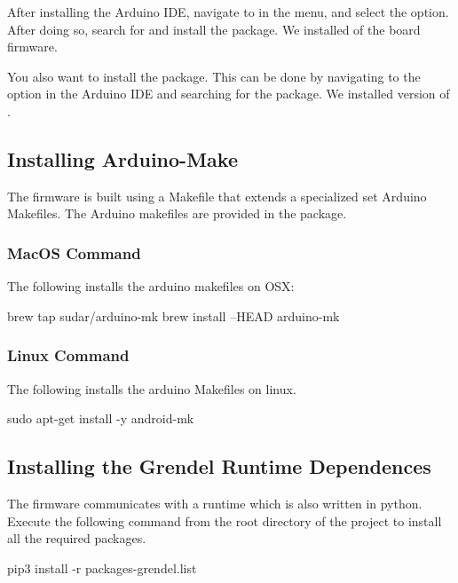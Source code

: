 After installing the Arduino IDE, navigate to  in the menu, and select the 
option. After doing so, search for  and install the  package. We installed  of the
   board firmware.

You also want to install the  package. This can be done by navigating to the 
 option in the Arduino IDE and
searching for the  package. We installed version  of .

\subsection{Installing Arduino-Make}
The firmware is built using a Makefile that extends a specialized set Arduino
Makefiles. The Arduino makefiles are provided in the  package.

\subsubsection{MacOS Command}
The following installs the arduino makefiles on OSX:

\begin{snippet}
brew tap sudar/arduino-mk
brew install --HEAD arduino-mk
\end{snippet}

\subsubsection{Linux Command}
The following installs the arduino Makefiles on linux.
\begin{snippet}
sudo apt-get install -y android-mk
\end{snippet}

\subsection{Installing the Grendel Runtime Dependences}


The firmware communicates with a runtime which is also written in python.
Execute the following command from the root directory of the 
project to install all the required packages.

\begin{snippet}
  pip3 install -r packages-grendel.list
\end{snippet}

